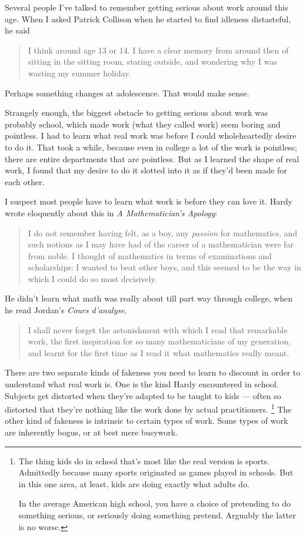 Several people I've talked to remember getting serious about work around
this age. When I asked Patrick Collison when he started to find idleness
distasteful, he said

\begin{quote}
I think around age 13 or 14. I have a clear memory from around then of
sitting in the sitting room, staring outside, and wondering why I was
wasting my summer holiday.
\end{quote}

Perhaps something changes at adolescence. That would make sense.

Strangely enough, the biggest obstacle to getting serious about work was
probably school, which made work (what they called work) seem boring and
pointless. I had to learn what real work was before I could
wholeheartedly desire to do it. That took a while, because even in
college a lot of the work is pointless; there are entire departments
that are pointless. But as I learned the shape of real work, I found
that my desire to do it slotted into it as if they'd been made for each
other.

I suspect most people have to learn what work is before they can love
it. Hardy wrote eloquently about this in \emph{A Mathematician's
Apology}:

\begin{quote}
I do not remember having felt, as a boy, any \emph{passion} for
mathematics, and such notions as I may have had of the career of a
mathematician were far from noble. I thought of mathematics in terms of
examinations and scholarships: I wanted to beat other boys, and this
seemed to be the way in which I could do so most decisively.
\end{quote}

He didn't learn what math was really about till part way through
college, when he read Jordan's \emph{Cours d'analyse}.

\begin{quote}
I shall never forget the astonishment with which I read that remarkable
work, the first inspiration for so many mathematicians of my generation,
and learnt for the first time as I read it what mathematics really
meant.
\end{quote}

There are two separate kinds of fakeness you need to learn to discount
in order to understand what real work is. One is the kind Hardy
encountered in school. Subjects get distorted when they're adapted to be
taught to kids --- often so distorted that they're nothing like the work
done by actual practitioners. \footnote{The thing kids do in school that's most like the real version is
sports. Admittedly because many sports originated as games played in
schools. But in this one area, at least, kids are doing exactly what
adults do.

In the average American high school, you have a choice of pretending to
do something serious, or seriously doing something pretend. Arguably the
latter is no worse.} The other kind of
fakeness is intrinsic to certain types of work. Some types of work are
inherently bogus, or at best mere busywork.


